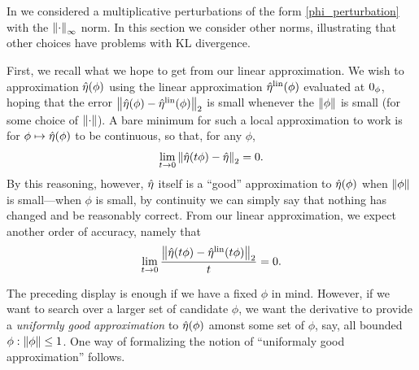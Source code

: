 




In  we considered a multiplicative perturbations
of the form \eqref{phi_perturbation} with the $\left\Vert\cdot\right\Vert_{\infty}$ norm.  In
this section we consider other norms, illustrating that other choices
have problems with KL divergence.

First, we recall what we hope to get from our linear approximation.  We wish to
approximation $\hat\eta(\phi)$ using the linear approximation $\hat\eta^{\mathrm{lin}}(\phi)$
evaluated at $0_\phi$, hoping that the error $\left\Vert\hat\eta(\phi) -
\hat\eta^{\mathrm{lin}}(\phi)\right\Vert_2$ is small whenever the $\left\Vert\phi\right\Vert$ is small (for some choice
of $\left\Vert\cdot\right\Vert$).  A bare minimum for such a local approximation to work is
for $\phi \mapsto \hat\eta(\phi)$ to be continuous, so that, for any
$\phi$,
%
\begin{align*}
%
\lim_{t \rightarrow 0} \norm{\etaopt(t \phi) - \etaopt}_2 = 0.
%
\end{align*}
%
By this reasoning, however, $\hat\eta$ itself is a ``good'' approximation to
$\hat\eta(\phi)$ when $\left\Vert\phi\right\Vert$ is small---when $\phi$ is small, by
continuity we can simply say that nothing has changed and be reasonably correct.
From our linear approximation, we expect another order of accuracy, namely that
%
\begin{align*}
%
\lim_{t \rightarrow 0} \frac{\norm{\etaopt(t \phi) - \etalin(t\phi)}_2}{t} = 0.
%
\end{align*}

The preceding display is enough if we have a fixed $\phi$ in mind.  However, if
we want to search over a larger set of candidate $\phi$, we want the derivative
to provide a {\em uniformly good approximation} to $\hat\eta(\phi)$ amonst some
set of $\phi$, say, all bounded $\phi: \left\Vert\phi\right\Vert \le 1$.  One way of
formalizing the notion of ``uniformaly good approximation'' follows.

